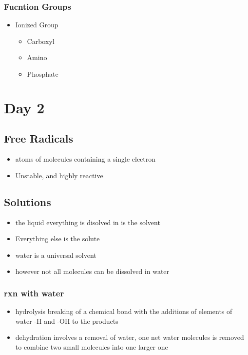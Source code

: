 \documentclass[11pt]{article}
\begin{document}
\subsubsection{Fucntion Groups}
\label{sec:org1d0e4ea}
\begin{itemize}
\item Ionized Group
\begin{itemize}
\item Carboxyl
\item Amino
\item Phosphate
\end{itemize}
\end{itemize}
\section{Day 2}
\label{sec:org3aaabc4}
\subsection{Free Radicals}
\label{sec:org996414a}
\begin{itemize}
\item atoms of molecules containing a single electron
\item Unstable, and highly reactive
\end{itemize}
\subsection{Solutions}
\label{sec:org2c6b823}
\begin{itemize}
\item the liquid everything is disolved in is the solvent
\item Everything else is the solute
\item water is a universal solvent
\item however not all molecules can be dissolved in water
\end{itemize}
\subsubsection{rxn with water}
\label{sec:org3f900c5}
\begin{itemize}
\item hydrolysis breaking of a chemical bond with the additions of elements of water -H and -OH to the products
\item dehydration involves a removal of water, one net water molecules is removed to combine two small molecules into one larger one
\end{itemize}
\end{document}
